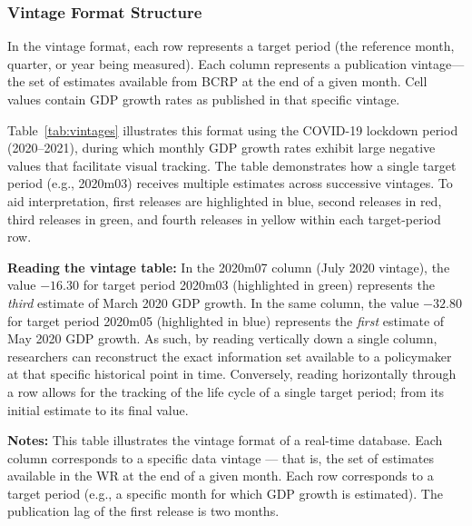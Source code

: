 \documentclass[12pt]{article}
\begin{document}
\subsubsection*{Vintage Format Structure}

In the vintage format, each row represents a target period (the reference month, quarter, or year being measured). Each column represents a publication vintage---the set of estimates available from BCRP at the end of a given month. Cell values contain GDP growth rates as published in that specific vintage.

Table~\ref{tab:vintages} illustrates this format using the COVID-19 lockdown period (2020--2021), during which monthly GDP growth rates exhibit large negative values that facilitate visual tracking. The table demonstrates how a single target period (e.g., 2020m03) receives multiple estimates across successive vintages. To aid interpretation, first releases are highlighted in blue, second releases in red, third releases in green, and fourth releases in yellow within each target-period row.

\textbf{Reading the vintage table:} In the 2020m07 column (July 2020 vintage), the value $-16.30$ for target period 2020m03 (highlighted in green) represents the \emph{third} estimate of March 2020 GDP growth. In the same column, the value $-32.80$ for target period 2020m05 (highlighted in blue) represents the \emph{first} estimate of May 2020 GDP growth. As such, by reading vertically down a single column, researchers can reconstruct the exact information set available to a policymaker at that specific historical point in time. Conversely, reading horizontally through a row allows for the tracking of the life cycle of a single target period; from its initial estimate to its final value. 


\begin{table}[t!]
\caption{Dataset of monthly vintages (illustrative excerpt)}
\label{tab:vintages}

\centering
\resizebox{\textwidth}{!}{%

}

\medskip
\footnotesize
\textbf{Notes:} This table illustrates the vintage format of a real-time database. Each column corresponds to a specific data vintage — that is, the set of estimates available in the WR at the end of a given month. Each row corresponds to a target period (e.g., a specific month for which GDP growth is estimated). The publication lag of the first release is two months.
\end{table}
\end{document}
